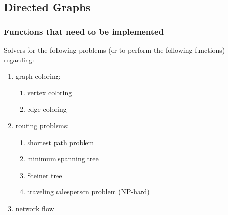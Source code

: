 \subsection{Directed Graphs}
\label{ssec:DirectedGraphs}



\subsubsection{Functions that need to be implemented}
\label{sssec:FunctionsThatNeedToBeImplemented}




Solvers for the following problems (or to perform the following functions) regarding: \vspace{-0.3cm}
\begin{enumerate} \itemsep -4pt
\item graph coloring: \vspace{-0.3cm}
	\begin{enumerate} \itemsep -2pt
	\item vertex coloring
	\item edge coloring
	\end{enumerate}
\item routing problems: \vspace{-0.3cm}
	\begin{enumerate} \itemsep -2pt
	\item shortest path problem
	\item minimum spanning tree
	\item Steiner tree
	\item traveling salesperson problem (NP-hard)
	\end{enumerate}
\item network flow
\end{enumerate}





